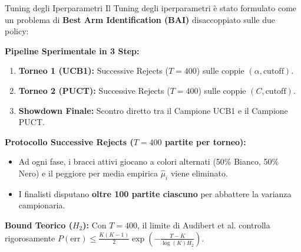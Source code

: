 \documentclass[10pt]{beamer}
\begin{document}
\begin{frame}{Tuning degli Iperparametri}
    Il Tuning degli iperparametri è stato formulato come un problema di \textbf{Best Arm Identification (BAI)} disaccoppiato sulle due policy:
    
    \vspace{0.15cm}
    \textbf{Pipeline Sperimentale in 3 Step:}
    \begin{enumerate}
        \item \textbf{Torneo 1 (UCB1):} Successive Rejects ($T = 400$) sulle coppie $(\alpha, \text{cutoff})$.
        \item \textbf{Torneo 2 (PUCT):} Successive Rejects ($T = 400$) sulle coppie $(C, \text{cutoff})$.
        \item \textbf{Showdown Finale:} Scontro diretto tra il Campione UCB1 e il Campione PUCT.
    \end{enumerate}

    \vspace{0.1cm}
    \textbf{Protocollo Successive Rejects ($T = 400$ partite per torneo):}
    \begin{itemize}
        \item Ad ogni fase, i bracci attivi giocano a colori alternati (50\% Bianco, 50\% Nero) e il peggiore per media empirica $\hat{\mu}_i$ viene eliminato.
        \item I finalisti disputano \textbf{oltre 100 partite ciascuno} per abbattere la varianza campionaria.
    \end{itemize}
    \vspace{0.05cm}
    \footnotesize
    \textbf{Bound Teorico ($H_2$):} Con $T=400$, il limite di Audibert et al. controlla rigorosamente $P(\text{err}) \le \frac{K(K-1)}{2} \exp\left(-\frac{T-K}{\overline{\log}(K) H_2}\right)$.
\end{frame}
\end{document}
